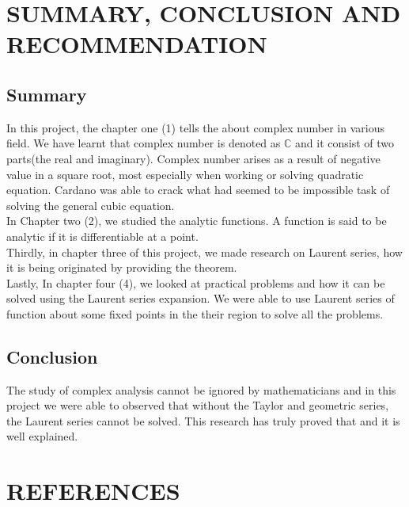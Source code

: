 \documentclass[11pt]{report}
\newcommand{\NI}{\noindent}
\newcommand{\complex}{\mathbb{C}}
\begin{document}
	
	\chapter{SUMMARY, CONCLUSION AND RECOMMENDATION}
	\section{Summary}
	In this project, the chapter one (1) tells the about complex number in various field. We have learnt that complex number is denoted as $\complex$ and it consist of two parts(the real and imaginary). Complex number arises as a result of negative value in a square root, most especially when working or solving quadratic equation. Cardano was able to crack what had seemed to be impossible task of solving the general cubic equation.\\
	
	\NI In Chapter two (2), we studied the analytic functions. A function is said to be analytic if it is differentiable at a point.\\
	
	\NI Thirdly, in chapter three of this project, we made research on Laurent series, how it is being originated by providing the theorem.\\
	
	\NI Lastly, In chapter four (4), we looked at practical problems and how it can be solved using the Laurent series expansion. We were able to use Laurent series of function about some fixed points in the their region to solve all the problems.
	\section{Conclusion}
	The study of complex analysis cannot be ignored by mathematicians and in this project we were able to observed that without the Taylor and geometric series, the Laurent series cannot be solved. This research has truly proved that and it is well explained.
	

	
	\chapter*{REFERENCES}
	
\end{document}
